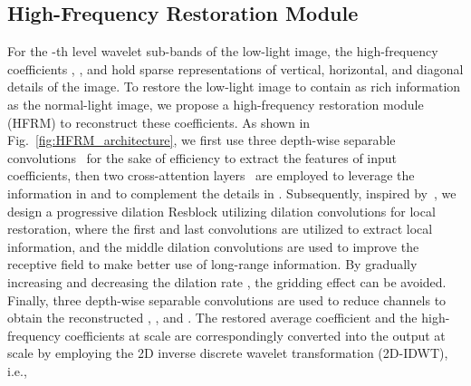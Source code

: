 \subsection{High-Frequency Restoration Module}\label{subsec:High-Frequency Restoration Module}
For the -th level wavelet sub-bands of the low-light image, the high-frequency coefficients , , and  hold sparse representations of vertical, horizontal, and diagonal details of the image. To restore the low-light image to contain as rich information as the normal-light image, we propose a high-frequency restoration module (HFRM) to reconstruct these coefficients. As shown in Fig.~\ref{fig:HFRM_architecture}, we first use three depth-wise separable convolutions~\cite{depth_conv} for the sake of efficiency to extract the features of input coefficients, then two cross-attention layers~\cite{cross_attention} are employed to leverage the information in  and  to complement the details in . Subsequently, inspired by~\cite{SFDNet}, we design a progressive dilation Resblock utilizing dilation convolutions for local restoration, where the first and last convolutions are utilized to extract local information, and the middle dilation convolutions are used to improve the receptive field to make better use of long-range information. By gradually increasing and decreasing the dilation rate , the gridding effect can be avoided. Finally, three depth-wise separable convolutions are used to reduce channels to obtain the reconstructed , , and . The restored average coefficient and the high-frequency coefficients at scale  are correspondingly converted into the output at scale  by employing the 2D inverse discrete wavelet transformation (2D-IDWT), i.e.,

